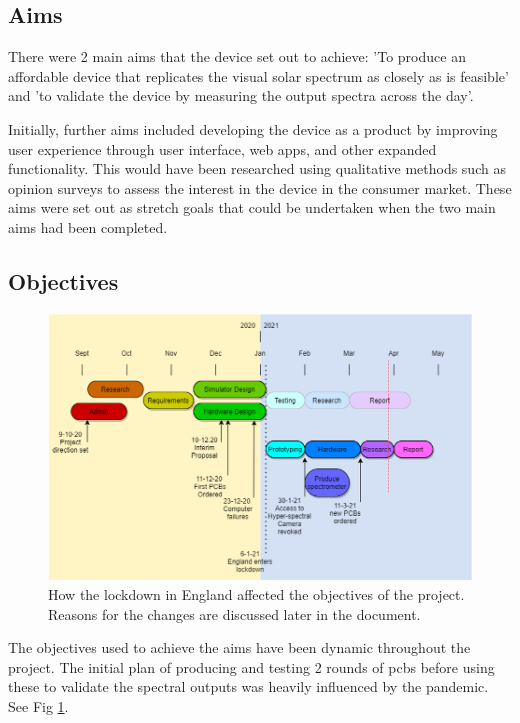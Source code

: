 \subsection{Aims}

There were 2 main aims that the device set out to achieve: 'To produce an affordable device that replicates the visual solar spectrum as closely as is feasible' and 'to validate the device by measuring the output spectra across the day'.

Initially, further aims included developing the device as a product by improving user experience through user interface, web apps, and other expanded functionality. This would have been researched using qualitative methods such as opinion surveys to assess the interest in the device in the consumer market. These aims were set out as stretch goals that could be undertaken when the two main aims had been completed.

\subsection{Objectives}

\begin{figure}[bt]
\includegraphics[width=\textwidth]{Images/plan}
\caption{How the lockdown in England affected the objectives of the project. Reasons for the changes are discussed later in the document.}
\label{Objectives}
\end{figure}

The objectives used to achieve the aims have been dynamic throughout the project. The initial plan of producing and testing 2 rounds of \acrfull{pcbs} before using these to validate the spectral outputs was heavily influenced by the pandemic. See Fig \ref{Objectives}.


